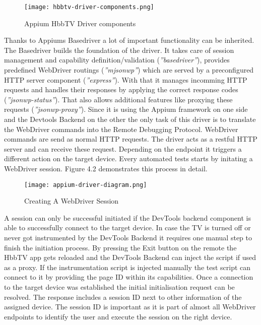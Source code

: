 \vspace{1cm}
\begin{figure}[htb]
  \centering
  \texttt{[image: hbbtv-driver-components.png]}\\
  \caption{Appium HbbTV Driver components}\label{fig:hbbtv-driver-components}
\end{figure}
\vspace{0.5cm}

Thanks to Appiums Basedriver a lot of important functionality can be inherited. The Basedriver
builds the foundation of the driver. It takes care of session management and capability
definition/validation (\textit{''basedriver''}), provides predefined WebDriver routings
(\textit{''mjsonwp''}) which are served by a preconfigured HTTP server component
(\textit{''express''}). With that it manages incomming HTTP requests and handles their responses
by applying the correct response codes (\textit{''jsonwp-status''}). That also allows additional
features like proxying these requests (\textit{''jsonwp-proxy''}). Since it is using the Appium
framework on one side and the Devtools Backend on the other the only task of this driver is to
translate the WebDriver commands into the Remote Debugging Protocol. WebDriver commands are send
as normal HTTP requests. The driver acts as a restful HTTP server and can receive these request.
Depending on the endpoint it triggers a different action on the target device. Every automated
tests starts by initating a WebDriver session. Figure 4.2 demonstrates this process in detail.

\vspace{1cm}
\begin{figure}[htb]
  \centering
  \texttt{[image: appium-driver-diagram.png]}\\
  \caption{Creating A WebDriver Session}\label{fig:appium-driver-diagram}
\end{figure}
\vspace{0.5cm}

A session can only be successful initiated if the DevTools backend component is able to successfully
connect to the target device. In case the TV is turned off or never got instrumented by the DevTools
Backend it requires one manual step to finish the initiation process. By pressing the Exit button
on the remote the HbbTV app gets reloaded and the DevTools Backend can inject the script if used as
a proxy. If the instrumentation script is injected manually the test script can connect to it by
providing the page ID within its capabilities. Once a connection to the target device was established
the initial initialisation request can be resolved. The response includes a session ID next to other
information of the assigned device. The session ID is important as it is part of almost all WebDriver
endpoints to identify the user and execute the session on the right device.

